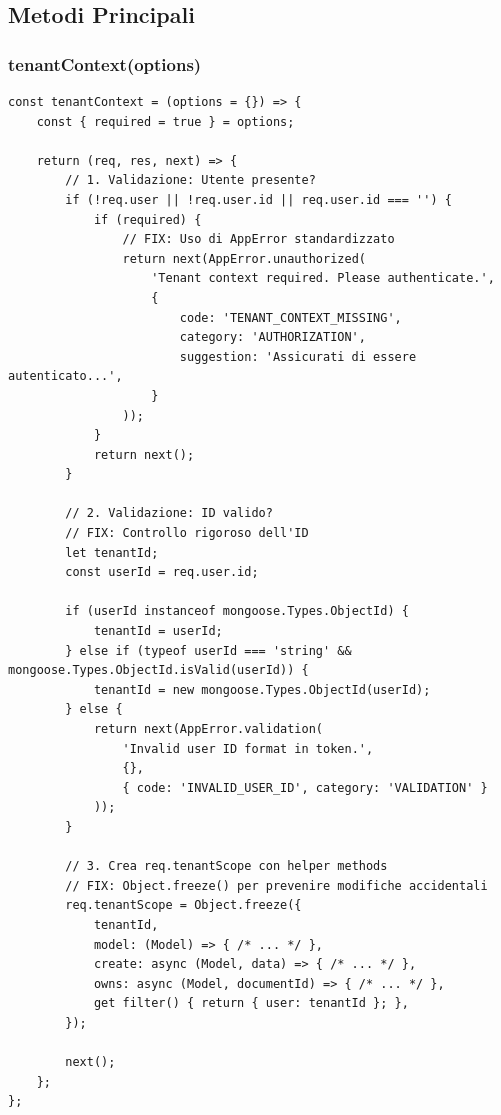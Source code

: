 \documentclass[11pt,a4paper]{article}
\begin{document}
\subsection{Metodi Principali}

\subsubsection{tenantContext(options)}

\begin{lstlisting}
const tenantContext = (options = {}) => {
    const { required = true } = options;

    return (req, res, next) => {
        // 1. Validazione: Utente presente?
        if (!req.user || !req.user.id || req.user.id === '') {
            if (required) {
                // FIX: Uso di AppError standardizzato
                return next(AppError.unauthorized(
                    'Tenant context required. Please authenticate.',
                    {
                        code: 'TENANT_CONTEXT_MISSING',
                        category: 'AUTHORIZATION',
                        suggestion: 'Assicurati di essere autenticato...',
                    }
                ));
            }
            return next();
        }

        // 2. Validazione: ID valido?
        // FIX: Controllo rigoroso dell'ID
        let tenantId;
        const userId = req.user.id;

        if (userId instanceof mongoose.Types.ObjectId) {
            tenantId = userId;
        } else if (typeof userId === 'string' && mongoose.Types.ObjectId.isValid(userId)) {
            tenantId = new mongoose.Types.ObjectId(userId);
        } else {
            return next(AppError.validation(
                'Invalid user ID format in token.',
                {},
                { code: 'INVALID_USER_ID', category: 'VALIDATION' }
            ));
        }

        // 3. Crea req.tenantScope con helper methods
        // FIX: Object.freeze() per prevenire modifiche accidentali
        req.tenantScope = Object.freeze({
            tenantId,
            model: (Model) => { /* ... */ },
            create: async (Model, data) => { /* ... */ },
            owns: async (Model, documentId) => { /* ... */ },
            get filter() { return { user: tenantId }; },
        });

        next();
    };
};
\end{lstlisting}
\end{document}
